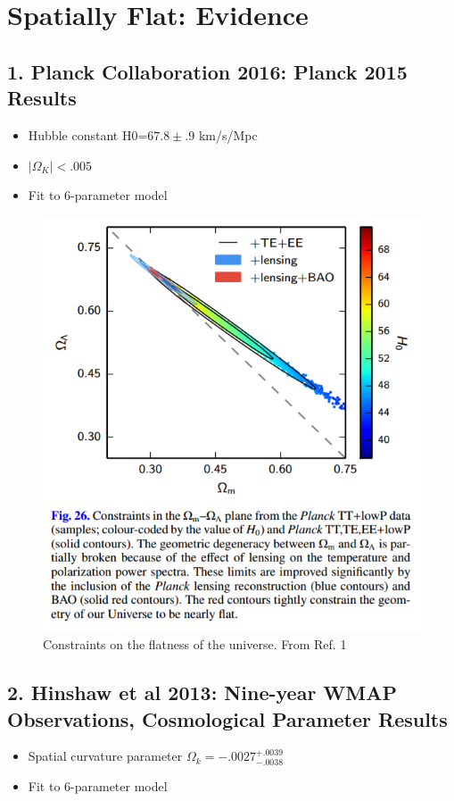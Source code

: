 \documentclass{article}
\begin{document}
\newpage

\section*{Spatially Flat: Evidence}

\subsection*{1. Planck Collaboration 2016: Planck 2015 Results}
\begin{itemize}
\item Hubble constant H0=$67.8\pm.9$ km/s/Mpc
\item $|\Omega_K|<.005$
\item Fit to 6-parameter model
\end{itemize}

\begin{figure}[h]
\begin{center}
\includegraphics[width=.8\textwidth,angle=0.]{spatialFlatness.png}
\end{center}
\caption{Constraints on the flatness of the universe. From Ref. 1}
\end{figure}

\subsection*{2. Hinshaw et al 2013: Nine-year WMAP Observations, Cosmological Parameter Results}
\begin{itemize}
\item Spatial curvature parameter $\Omega_k=-.0027^{+.0039}_{-.0038}$
\item Fit to 6-parameter model
\end{itemize}
\end{document}
